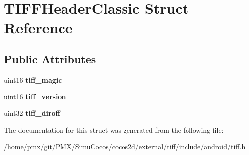 \hypertarget{structTIFFHeaderClassic}{}\section{T\+I\+F\+F\+Header\+Classic Struct Reference}
\label{structTIFFHeaderClassic}
\subsection*{Public Attributes}
\begin{DoxyCompactItemize}
\item 
\mbox{\label{structTIFFHeaderClassic_a23f8e0c949d3ec18a232f9dadeeaf85b}} 
uint16 {\bfseries tiff\+\_\+magic}
\item 
\mbox{\label{structTIFFHeaderClassic_ad4590d6c7e167277b08b0ef7eedc21c4}} 
uint16 {\bfseries tiff\+\_\+version}
\item 
\mbox{\label{structTIFFHeaderClassic_a198ced6040ba4dd3069876894885a595}} 
uint32 {\bfseries tiff\+\_\+diroff}
\end{DoxyCompactItemize}


The documentation for this struct was generated from the following file\+:\begin{DoxyCompactItemize}
\item 
/home/pmx/git/\+P\+M\+X/\+Simu\+Cocos/cocos2d/external/tiff/include/android/tiff.\+h\end{DoxyCompactItemize}
